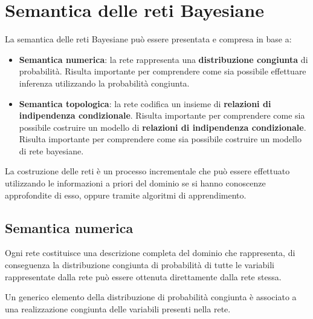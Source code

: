 \section{Semantica delle reti Bayesiane}
La semantica delle reti Bayesiane può essere presentata e compresa in base a:
\begin{itemize}
    \item \textbf{Semantica numerica}: la rete rappresenta una \textbf{distribuzione
              congiunta} di probabilità. Risulta importante per comprendere come
          sia possibile effettuare inferenza utilizzando la probabilità congiunta.
    \item \textbf{Semantica topologica}: la rete codifica un insieme di
          \textbf{relazioni di indipendenza condizionale}. Risulta importante per
          comprendere come sia possibile costruire un modello di
          \textbf{relazioni di indipendenza condizionale}. Risulta importante per
          comprendere come sia possibile costruire un modello di
          rete bayesiane.
\end{itemize}
La costruzione delle reti è un processo incrementale che può essere effettuato
utilizzando le informazioni a priori del dominio se si hanno conoscenze
approfondite di esso, oppure tramite algoritmi di apprendimento.
\subsection{Semantica numerica}
Ogni rete costituisce una descrizione completa del dominio che rappresenta, di
conseguenza la distribuzione congiunta di probabilità di tutte le variabili
rappresentate dalla rete può essere ottenuta direttamente dalla rete stessa.

Un generico elemento della distribuzione di probabilità congiunta è associato a
una realizzazione congiunta delle variabili presenti nella rete.

